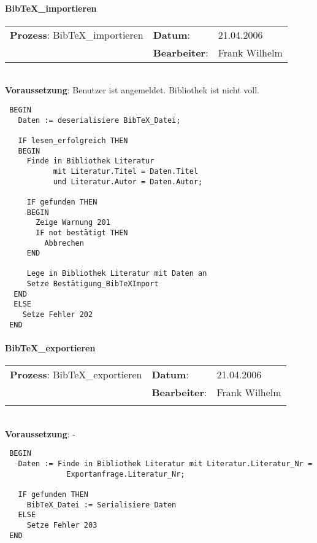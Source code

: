 \paragraph{BibTeX\_importieren}
\begin{tabular}[t]{p{9.5cm}ll}
\textbf{Prozess}: BibTeX\_importieren  	&\textbf{Datum}:      &21.04.2006\\
					&\textbf{Bearbeiter}: &Frank Wilhelm\\
\end{tabular}

\hrulefill\\
\textbf{Voraussetzung}: Benutzer ist angemeldet. Bibliothek ist nicht voll.
\begin{verbatim}
 BEGIN
   Daten := deserialisiere BibTeX_Datei;

   IF lesen_erfolgreich THEN
   BEGIN
     Finde in Bibliothek Literatur
           mit Literatur.Titel = Daten.Titel
           und Literatur.Autor = Daten.Autor;

     IF gefunden THEN
     BEGIN
       Zeige Warnung 201
       IF not bestätigt THEN
         Abbrechen
     END
   
     Lege in Bibliothek Literatur mit Daten an
     Setze Bestätigung_BibTeXImport
  END
  ELSE
    Setze Fehler 202
 END
\end{verbatim}
\hrulefill


\paragraph{BibTeX\_exportieren}
\begin{tabular}[t]{p{9.5cm}ll}
\textbf{Prozess}: BibTeX\_exportieren  	&\textbf{Datum}:      &21.04.2006\\
					&\textbf{Bearbeiter}: &Frank Wilhelm\\\\
\end{tabular}

\hrulefill\\
\textbf{Voraussetzung}: -
\begin{verbatim}
 BEGIN
   Daten := Finde in Bibliothek Literatur mit Literatur.Literatur_Nr = 
              Exportanfrage.Literatur_Nr;
  
   IF gefunden THEN
     BibTeX_Datei := Serialisiere Daten
   ELSE
     Setze Fehler 203
 END
\end{verbatim}

\hrulefill

